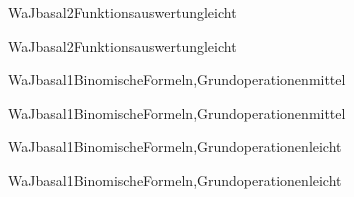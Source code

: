 \documentclass[12pt]{article}
\begin{document}
    \begin{Add}{WaJ}{basal2}{Funktionsauswertung}{leicht}
    \solution{ }
    \end{Add}
    \begin{Add}{WaJ}{basal2}{Funktionsauswertung}{leicht}
    \end{Add}
    

    \begin{Add}{WaJ}{basal1}{BinomischeFormeln,Grundoperationen}{mittel}
    \solution{ }
    \end{Add}
    \begin{Add}{WaJ}{basal1}{BinomischeFormeln,Grundoperationen}{mittel}
    \end{Add}
    

\begin{Add}{WaJ}{basal1}{BinomischeFormeln,Grundoperationen}{leicht}
\solution{ }
\end{Add}
\begin{Add}{WaJ}{basal1}{BinomischeFormeln,Grundoperationen}{leicht}
\end{Add}
\end{document}
